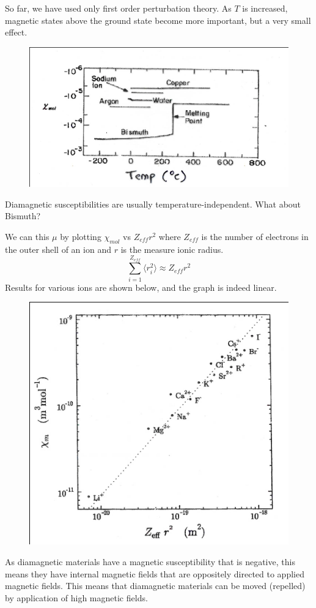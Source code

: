 \documentclass[a4paper, 11pt, normalem]{report}
\begin{document}
So far, we have used only first order perturbation theory. 
As $T$ is increased, magnetic states above the ground state become more important, but a very small effect.
\begin{figure}[H]
    \centering
    \includegraphics[scale=0.5]{bismuth.png}
\end{figure}
Diamagnetic susceptibilities are usually temperature-independent.
What about Bismuth?

We can this $\mu$ by plotting $\chi_{mol}$ vs $Z_{eff}r^2$ where $Z_{eff}$ is the number of electrons in the outer shell of an ion and $r$ is the measure ionic radius.
\begin{equation}
    \sum_{i=1}^{Z_{eff}} \langle r_i^2\rangle \approx Z_{eff}r^2
\end{equation}
Results for various ions are shown below, and the graph is indeed linear. 
\begin{figure}[H]
    \centering
    \includegraphics[scale=0.5]{ions.png}
\end{figure}
As diamagnetic materials have a magnetic susceptibility that is negative, this means they have internal magnetic fields that are oppositely directed to applied magnetic fields. 
This means that diamagnetic materials can be moved (repelled) by application of high magnetic fields. 
\end{document}

